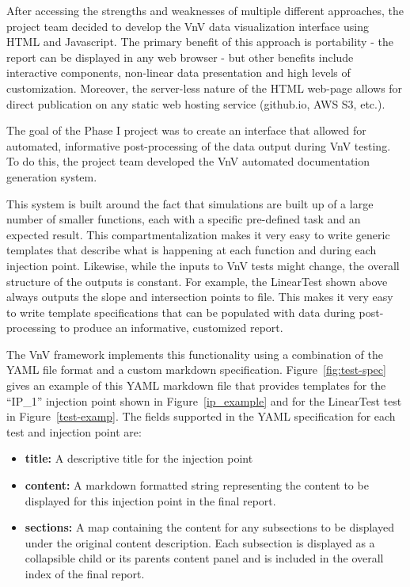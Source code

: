 After accessing the strengths and weaknesses of multiple different approaches, the project team decided to develop the VnV data visualization interface using HTML and Javascript. The primary benefit of this approach is portability - the report can be displayed in any web browser - but other benefits include interactive components, non-linear data presentation and high levels of customization. Moreover, the server-less nature of the HTML web-page allows for direct publication on any static web hosting service (github.io, AWS S3, etc.). 

The goal of the Phase I project was to create an interface that allowed for automated, informative post-processing of the data output during VnV testing. To do this, the project team developed the VnV automated documentation generation system. 

This system is built around the fact that simulations are built up of a large number of smaller functions, each with a specific pre-defined task and an expected result. This compartmentalization makes it very easy to write generic templates that describe what is happening at each function and during each injection point. Likewise, while the inputs to VnV tests might change, the overall structure of the outputs is constant. For example, the LinearTest shown above always outputs the slope and intersection points to file. This makes it very easy to write template specifications that can be populated with data during post-processing to produce an informative, customized report. 

The VnV framework implements this functionality using a combination of the YAML file format and a custom markdown specification. Figure~\ref{fig:test-spec} gives an example of this YAML
markdown file that provides templates for the ``IP\_1'' injection point shown in Figure~\ref{ip_example} and for the LinearTest test in Figure~\ref{test-examp}. The fields supported in the YAML specification for each test and injection point are:

\begin{itemize}
 \item {\bf title:} A descriptive title for the injection point 
 \item {\bf content:} A markdown formatted string representing the content to be displayed for this injection point in the final report.
 \item {\bf sections:} A map containing the content for any subsections to be displayed under the original content description. Each subsection is displayed  as a collapsible child or its parents content panel and is included in the overall index of the final report. 
 \end{itemize}

